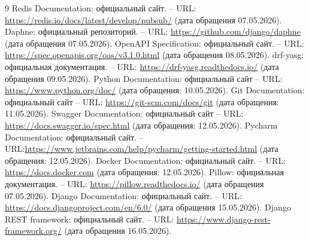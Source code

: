 \begin{thebibliography}{9}
     Redis Documentation: официальный сайт. – URL: \url{https://redis.io/docs/latest/develop/pubsub/} (дата обращения 07.05.2026).
     Daphne: официальный репозиторий. – URL: \url{https://github.com/django/daphne} (дата обращения 07.05.2026).
     OpenAPI Specification: официальный сайт. – URL: \url{https://spec.openapis.org/oas/v3.1.0.html} (дата обращения 08.05.2026).
     drf-yasg: официальная документация. – URL: \url{https://drf-yasg.readthedocs.io/} (дата обращения 09.05.2026).
     Python Documentation: официальный сайт – URL: \url{https://www.python.org/doc/} (дата обращения: 10.05.2026).
     Git Documentation: официальный сайт – URL: \url{https://git-scm.com/docs/git} (дата обращения: 11.05.2026).
     Swagger Documentation: официальный сайт – URL: \url{https://docs.swagger.io/spec.html} (дата обращения: 12.05.2026). 
     Pycharm Documentation: официальный сайт. – URL:\url{https://www.jetbrains.com/help/pycharm/getting-started.html} (дата обращения: 12.05.2026). 
     Docker Documentation: официальный сайт. – URL: \url{https://docs.docker.com} (дата обращения: 12.05.2026). 
     Pillow: официальная документация. – URL: \url{https://pillow.readthedocs.io/} (дата обращения 07.05.2026).
     Django Documentation: официальный сайт. – URL: \url{https://docs.djangoproject.com/en/6.0/} (дата обращения 15.05.2026).
     Django REST framework: официальный сайт. – URL: \url{https://www.django-rest-framework.org/} (дата обращения 16.05.2026).
\end{thebibliography}
